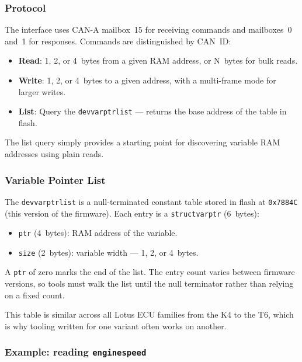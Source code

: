 \documentclass[a4paper,11pt]{article}
\renewcommand{\_}{\oldunderscore\allowbreak}
\begin{document}
\subsubsection*{Protocol}

The interface uses CAN-A mailbox~15 for receiving commands and mailboxes~0
and~1 for responses. Commands are distinguished by CAN~ID:

\begin{itemize}
\item \textbf{Read}: 1, 2, or 4~bytes from a given RAM address, or N~bytes
      for bulk reads.
\item \textbf{Write}: 1, 2, or 4~bytes to a given address, with a multi-frame
      mode for larger writes.
\item \textbf{List}: Query the \texttt{dev\_varptr\_list} --- returns the base
      address of the table in flash.
\end{itemize}

The list query simply provides a starting point for discovering variable RAM
addresses using plain reads.

\subsubsection*{Variable Pointer List}

The \texttt{dev\_varptr\_list} is a null-terminated constant table stored in
flash at \texttt{0x7884C} (this version of the firmware). Each entry is a
\texttt{struct\_varptr} (6~bytes):

\begin{itemize}
\item \texttt{ptr} (4~bytes): RAM address of the variable.
\item \texttt{size} (2~bytes): variable width --- 1, 2, or 4~bytes.
\end{itemize}

A \texttt{ptr} of zero marks the end of the list. The entry count varies
between firmware versions, so tools must walk the list until the null
terminator rather than relying on a fixed count.

This table is similar across all Lotus ECU families from the K4 to the T6,
which is why tooling written for one variant often works on another.

\subsubsection*{Example: reading \texttt{engine\_speed\_2}}
\end{document}
